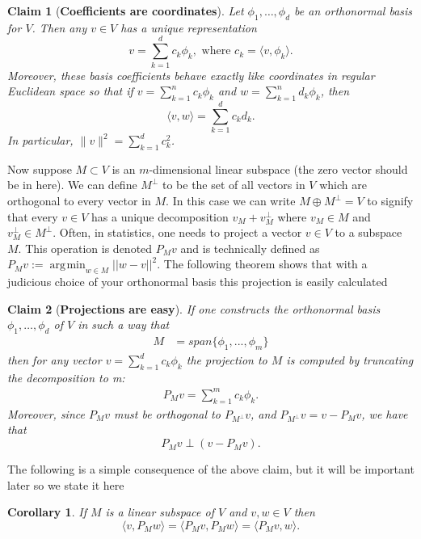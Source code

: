 \documentclass[11pt]{report}
\newtheorem{claim}{Claim}
\newtheorem{corollary}{Corollary}
\DeclareMathOperator*{\argmin}{\arg\!\min}
\begin{document}
\begin{claim}[{\bf Coefficients are coordinates}] Let $\phi_1,\ldots, \phi_d$ be an orthonormal basis for $V$. Then any $v\in V$ has a unique representation 
\[\boxed{ v = \sum_{k=1}^d c_k \phi_k,\,\,\text{where $c_k = \langle v, \phi_k\rangle$}.} \]
 Moreover, these basis coefficients behave exactly like coordinates in regular Euclidean space so that if $v = \sum_{k=1}^n c_k \phi_k$ and $w = \sum_{k=1}^n d_k \phi_k$, then
\[
\boxed{\langle v,w\rangle = \sum_{k=1}^d c_kd_k.}
\]
In particular,  $\| v \|^2 = \sum_{k=1}^d c_k^2$.
\end{claim}



Now suppose  $M\subset V$ is an $m$-dimensional linear subspace (the zero vector should be in here). We can define $M^{\perp}$ to be the set of all vectors in $V$ which are orthogonal to  every vector in $M$. In this case we can write $M \oplus M^{\perp} = V$ to signify that every $v\in V$ has a unique decomposition $v_M + v_M^\perp$ where $v_M\in M$ and $v_M^\perp \in M^\perp$. Often, in statistics, one needs to project a vector $v\in V$ to a subspace $M$. This operation is denoted $P_M v$ and is technically defined as $P_Mv := \argmin_{w \in M} ||w-v||^2 $. The following theorem shows that with a judicious choice of your orthonormal basis this projection is easily calculated

\begin{claim}[{\bf Projections are easy}]\label{proj1} If one constructs the orthonormal basis $\phi_1,\ldots, \phi_d$ of $V$ in such a way that
\begin{align*}
	M &= span\{\phi_1,...,\phi_m\} \label{span} 
\end{align*}
then for any vector $v=\sum_{k=1}^d c_k \phi_k$ the projection to $M$ is computed by truncating the decomposition to m:
\begin{align}
\boxed{P_Mv = \sum\limits_{k=1}^m c_k\phi_k }.
\end{align}
Moreover, since $P_Mv$ must be orthogonal to  $P_{M^{\perp}}v$, and $P_{M^{\perp}}v = v - P_Mv$, we have that 
\[\boxed{P_Mv \perp (v - P_Mv).}\]

\end{claim}



The following is a simple consequence of the above claim, but it will be important later so we state it here
\begin{corollary}\label{cor1}
If $M$ is a linear subspace of $V$ and $v,w \in V$ then
\[\langle v, P_M w\rangle = \langle P_M v, P_M w\rangle = \langle P_M v,  w\rangle. \]  
\end{corollary}
\end{document}

